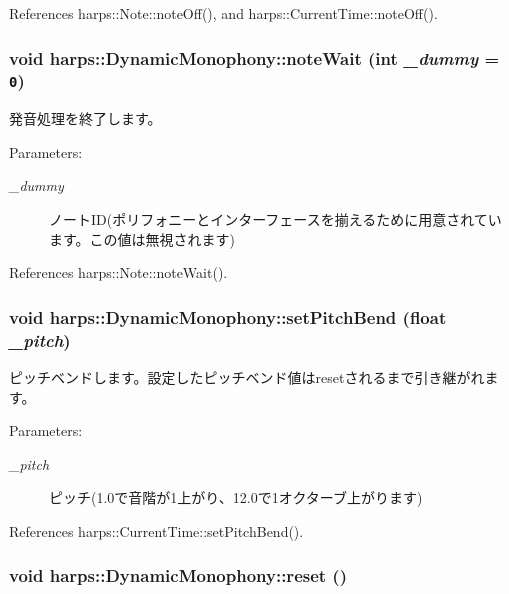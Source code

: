 References harps::Note::noteOff(), and harps::CurrentTime::noteOff().
\subsubsection[noteWait]{\setlength{\rightskip}{0pt plus 5cm}void harps::DynamicMonophony::noteWait (int {\em \_\-dummy} = {\tt 0})\hspace{0.3cm}{\tt  [inline]}}\label{classharps_1_1DynamicMonophony_25728aacf3836d4e1fe4e401b02021df}


発音処理を終了します。 \begin{Desc}
\item[Parameters:]
\begin{description}
\item[{\em \_\-dummy}]ノートID(ポリフォニーとインターフェースを揃えるために用意されています。この値は無視されます) \end{description}
\end{Desc}


References harps::Note::noteWait().
\subsubsection[setPitchBend]{\setlength{\rightskip}{0pt plus 5cm}void harps::DynamicMonophony::setPitchBend (float {\em \_\-pitch})\hspace{0.3cm}{\tt  [inline]}}\label{classharps_1_1DynamicMonophony_4d304ca1400cb443cdb57a17cdedb3db}


ピッチベンドします。設定したピッチベンド値はresetされるまで引き継がれます。 \begin{Desc}
\item[Parameters:]
\begin{description}
\item[{\em \_\-pitch}]ピッチ(1.0で音階が1上がり、12.0で1オクターブ上がります) \end{description}
\end{Desc}


References harps::CurrentTime::setPitchBend().
\subsubsection[reset]{\setlength{\rightskip}{0pt plus 5cm}void harps::DynamicMonophony::reset ()\hspace{0.3cm}{\tt  [inline]}}\label{classharps_1_1DynamicMonophony_9293fc3cfa3044994c65a06c0e5709dc}


